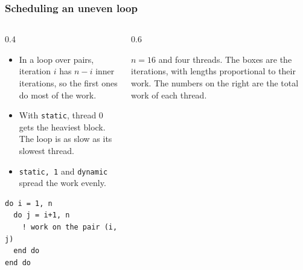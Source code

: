 \begin{frame}[fragile]
  \frametitle{Scheduling an uneven loop}
  \begin{columns}[T]
    \begin{column}{0.4\textwidth}
      \begin{itemize}
        \item In a loop over pairs, iteration $i$ has $n - i$ inner iterations, so the first ones do most of the work.
        \item With \texttt{static}, thread 0 gets the heaviest block. The loop is as slow as its slowest thread.
        \item \texttt{static, 1} and \texttt{dynamic} spread the work evenly.
      \end{itemize}

      \begin{lstlisting}
do i = 1, n
  do j = i+1, n
    ! work on the pair (i, j)
  end do
end do
      \end{lstlisting}
    \end{column}

    \begin{column}{0.6\textwidth}
      \centering
      \scalebox{0.88}{}

      \vspace*{1mm}
      {\small $n = 16$ and four threads. The boxes are the iterations, with lengths proportional to their work. The numbers on the right are the total work of each thread.}
    \end{column}
  \end{columns}
\end{frame}


